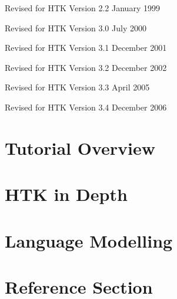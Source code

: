 \documentclass[a4paper,oneside]{book}
\begin{document}
{\noindent Revised for HTK Version 2.2 January 1999 
\vspace{0.1cm}

\noindent Revised for HTK Version 3.0 July 2000 
\vspace{0.1cm}

\noindent Revised for HTK Version 3.1 December 2001
\vspace{0.1cm}

\noindent Revised for HTK Version 3.2 December 2002
\vspace{0.1cm}

\noindent Revised for HTK Version 3.3 April 2005
\vspace{0.1cm}

\noindent Revised for HTK Version 3.4 December 2006
\vspace{0.1cm}
}

\newpage
\tableofcontents

\newpage
\pagestyle{myheadings}

\part{Tutorial Overview}




\part{HTK in Depth}











\part{Language Modelling}




\part{Reference Section}







































   
\clearpage
{}
\printindex
\end{document}
